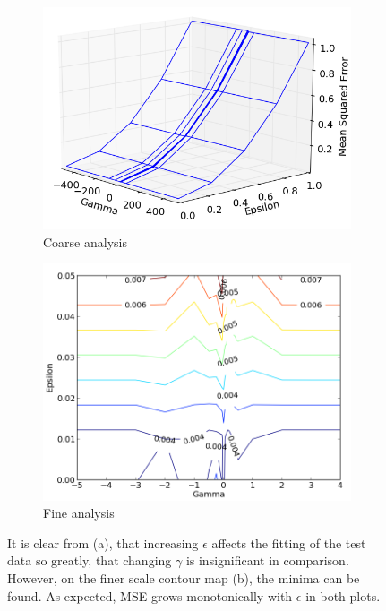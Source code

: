 \documentclass[12pt,a4paper,notitlepage,twoside]{scrbook}
\begin{document}
\begin{figure}[h!]
\centering
\begin{subfigure}[b]{.49\textwidth}
  \centering
  \includegraphics[width=\linewidth]{figs/coarse_tune2.png}
  \caption{Coarse analysis\label{coarse}}
\end{subfigure}
\begin{subfigure}[b]{.49\textwidth}
  \centering
  \includegraphics[width=0.9\linewidth]{figs/fine_tune_tr.png}
  \caption{Fine analysis\label{fine}}
\end{subfigure}
\caption{It is clear from (a), that increasing $\epsilon$ affects the fitting
	of the test data so greatly, that changing $\gamma$ is insignificant in comparison.
	However, on the finer scale contour map (b), the minima can be found. As expected, MSE grows
	monotonically with $\epsilon$ in both plots.\label{coarse_fine}}
\end{figure}
\end{document}
